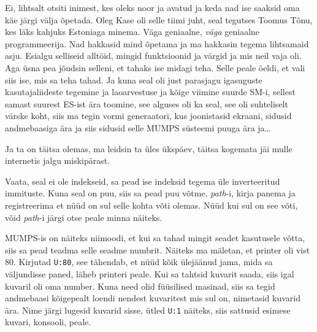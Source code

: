 Ei, lihtsalt otsiti inimest, kes oleks noor ja avatud ja keda nad ise saaksid 
oma käe järgi välja õpetada. Oleg Kase oli selle tiimi 
juht, seal tegutses Toomus Tõnu, kes läks kahjuks 
Estoniaga minema. Väga geniaalne, \emph{väga} geniaalne programmeerija. Nad 
hakkasid mind õpetama ja ma hakkasin tegema lihtsamaid asju. Esialgu selliseid 
alltöid, mingid funktsioonid ja värgid ja mis neil vaja oli. Aga üsna pea 
jõudsin selleni, et tahaks ise midagi teha. Selle peale öeldi, et vali siis 
ise, mis  sa teha tahad. Ja kuna seal oli just parasjagu igasuguste 
kasutajaliideste tegemine ja laoarvestuse ja kõige viimine suurde 
SM-i, sellest samast suurest ES-ist ära toomine, see 
alguses oli ka seal, see oli suhteliselt värske koht, siis ma tegin vormi 
generaatori, kus joonistasid ekraani, sidusid andmebaasiga ära ja siis sidusid 
selle MUMPS süsteemi puuga ära ja\ldots


Ja ta on täitsa olemas, ma leidsin ta üles ükspäev, täitsa kogemata jäi mulle 
internetis jalgu miskipärast. 

Vaata, seal ei ole indekseid, sa pead ise indeksid tegema üle inverteeritud 
immituste. Kuna seal on puu, siis sa pead puu võtme, \emph{path}-i, kirja 
panema ja registreerima et nüüd on sul selle kohta võti olemas. Nüüd kui sul on 
see võti, võid \emph{path}-i järgi otse peale minna näiteks. 

MUMPS-is on näiteks niimoodi, et kui sa tahad mingit seadet kasutusele võtta, 
siis sa pead teadma selle seadme numbrit. Näiteks ma mäletan, et printer oli 
vist 80. Kirjutad \verb|U:80|, see tähendab, et nüüd kõik ülejäänud jama, mida 
sa väljundisse paned, läheb printeri peale. Kui sa tahtsid kuvarit saada, siis 
igal kuvaril oli oma number. Kuna need olid füüsilised masinad, siis sa tegid 
andmebaasi kõigepealt loendi nendest kuvaritest mis sul on, nimetasid kuvarid 
ära. Nime järgi lugesid kuvarid sisse, ütled \verb|U:1| näiteks, siis sattusid 
esimese kuvari, konsooli, peale. 

